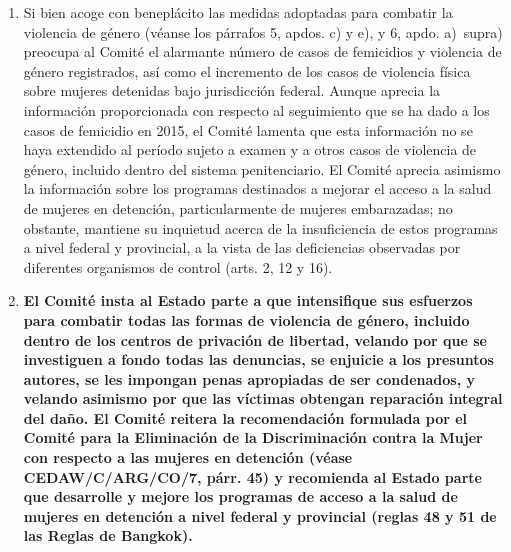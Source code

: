 \documentclass[10pt,twoside,spanish,a5paper,]{book}
\begin{document}
\begin{enumerate}
\def\labelenumi{\arabic{enumi}.}
\setcounter{enumi}{38}
\item
  Si bien acoge con beneplácito las medidas adoptadas para combatir la
  violencia de género (véanse los párrafos 5, apdos. c) y e), y 6, apdo.
  a)~supra) preocupa al Comité el alarmante número de casos de
  femicidios y violencia de género registrados, así como el incremento
  de los casos de violencia física sobre mujeres detenidas bajo
  jurisdicción federal. Aunque aprecia la información proporcionada con
  respecto al seguimiento que se ha dado a los casos de femicidio en
  2015, el Comité lamenta que esta información no se haya extendido al
  período sujeto a examen y a otros casos de violencia de género,
  incluido dentro del sistema penitenciario. El Comité aprecia asimismo
  la información sobre los programas destinados a mejorar el acceso a la
  salud de mujeres en detención, particularmente de mujeres embarazadas;
  no obstante, mantiene su inquietud acerca de la insuficiencia de estos
  programas a nivel federal y provincial, a la vista de las deficiencias
  observadas por diferentes organismos de control (arts. 2, 12 y 16).
\item
  \textbf{El Comité insta al Estado parte a que intensifique sus
  esfuerzos para combatir todas las formas de violencia de género,
  incluido dentro de los centros de privación de libertad, velando por
  que se investiguen a fondo todas las denuncias, se enjuicie a los
  presuntos autores, se les impongan penas apropiadas de ser condenados,
  y velando asimismo por que las víctimas obtengan reparación integral
  del daño. El Comité reitera la recomendación formulada por el Comité
  para la Eliminación de la Discriminación contra la Mujer con respecto
  a las mujeres en detención (véase CEDAW/C/ARG/CO/7, párr. 45) y
  recomienda al Estado parte que desarrolle y mejore los programas de
  acceso a la salud de mujeres en detención a nivel federal y provincial
  (reglas 48 y 51 de las Reglas de Bangkok).}
\end{enumerate}
\end{document}

